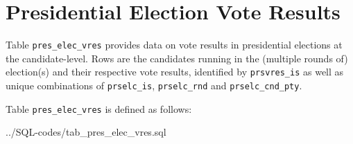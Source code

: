 \section{Presidential Election Vote Results}\label{subsec_tab_pres_elec_vres}
Table \texttt{\footnotesize pres\_elec\_vres} provides data on vote results in presidential elections at the candidate-level. 
Rows are the candidates running in the (multiple rounds of) election(s) and their respective vote results, identified by \texttt{\footnotesize prsvres\_is} as well as unique combinations of \texttt{\footnotesize prselc\_is}, \texttt{\footnotesize prselc\_rnd} and \texttt{\footnotesize prselc\_cnd\_pty}.

Table \texttt{\footnotesize pres\_elec\_vres} is defined as follows:


%
{../SQL-codes/tab_pres_elec_vres.sql}

